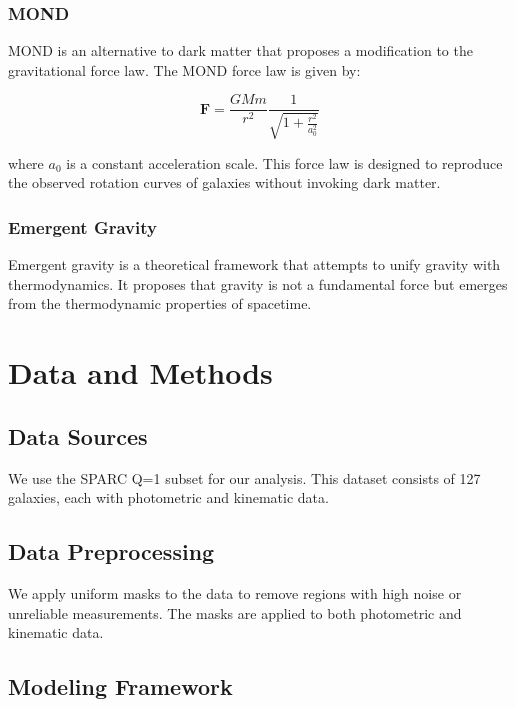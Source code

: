 \documentclass[usenatbib]{mnras}
\begin{document}
\subsubsection{MOND}

MOND \citep{Milgrom1983, FamaeyMcGaugh2012} is an alternative to dark matter that proposes a modification to the gravitational force law. The MOND force law is given by:

\begin{equation}
\mathbf{F} = \frac{GMm}{r^2} \frac{1}{\sqrt{1 + \frac{r^2}{a_0^2}}}
\end{equation}

where $a_0$ is a constant acceleration scale. This force law is designed to reproduce the observed rotation curves of galaxies without invoking dark matter.

\subsubsection{Emergent Gravity}

Emergent gravity \citep{Verlinde2011, Verlinde2017} is a theoretical framework that attempts to unify gravity with thermodynamics. It proposes that gravity is not a fundamental force but emerges from the thermodynamic properties of spacetime.

\section{Data and Methods}

\subsection{Data Sources}

We use the SPARC Q=1 subset \citep{McGaugh2016} for our analysis. This dataset consists of 127 galaxies, each with photometric and kinematic data.

\subsection{Data Preprocessing}

We apply uniform masks to the data to remove regions with high noise or unreliable measurements. The masks are applied to both photometric and kinematic data.

\subsection{Modeling Framework}
\end{document}
